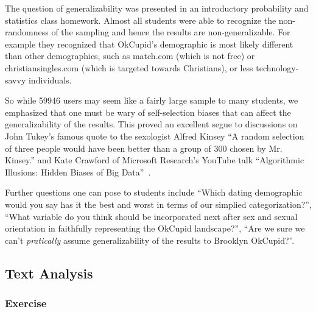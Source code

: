 \documentclass{article}\usepackage[]{graphicx}\usepackage[]{color}
\begin{document}
The question of generalizability was presented in an introductory probability and statistics class homework.  Almost all students were able to recognize the non-randomness of the sampling and hence the results are non-generalizable.  For example they recognized that OkCupid's demographic is most likely different than other demographics, such as match.com (which is not free) or christiansingles.com (which is targeted towards Christians), or less technology-savvy individuals.

So while 59946 users may seem like a fairly large sample to many students, we emphasized that one must be wary of self-selection biases that can affect the generalizability of the results.  This proved an excellent segue to discussions on John Tukey's famous quote to the sexologist Alfred Kinsey ``A random selection of three people would have been better than a group of 300 chosen by Mr. Kinsey.'' and Kate Crawford of Microsoft Research's YouTube talk ``Algorithmic Illusions: Hidden Biases of Big Data''~\cite{Strata}.

Further questions one can pose to students include ``Which dating demographic would you say has it the best and worst in terms of our simplied categorization?'', ``What variable do you think should be incorporated next after sex and sexual orientation in faithfully representing the OkCupid landscape?'', ``Are we sure we can't \textit{pratically} assume generalizability of the results to Brooklyn OkCupid?''.







\subsection{Text Analysis}\label{essays}
\subsubsection{Exercise}
\end{document}

